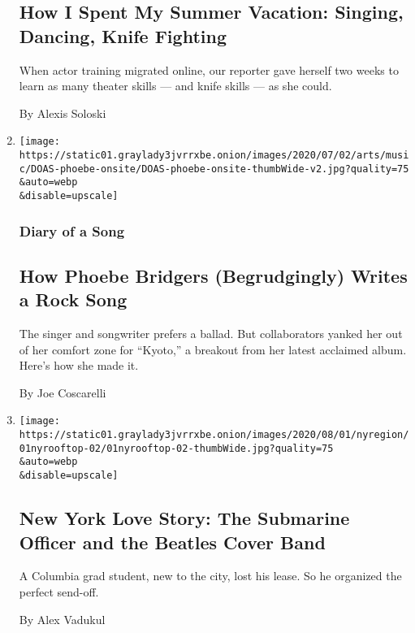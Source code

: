 \begin{enumerate}
  \hypertarget{how-i-spent-my-summer-vacation-singing-dancing-knife-fighting}{%
  \subsection{How I Spent My Summer Vacation: Singing, Dancing, Knife
  Fighting}\label{how-i-spent-my-summer-vacation-singing-dancing-knife-fighting}}

  When actor training migrated online, our reporter gave herself two
  weeks to learn as many theater skills --- and knife skills --- as she
  could.

  By Alexis Soloski
\item
  \href{/2020/07/30/arts/music/phoebe-bridgers-kyoto.html}{}

  \texttt{[image: https://static01.graylady3jvrrxbe.onion/images/2020/07/02/arts/music/DOAS-phoebe-onsite/DOAS-phoebe-onsite-thumbWide-v2.jpg?quality=75\\\&auto=webp\\\&disable=upscale]}

  \hypertarget{diary-of-a-song}{%
  \subsubsection{Diary of a Song}\label{diary-of-a-song}}

  \hypertarget{how-phoebe-bridgers-begrudgingly-writes-a-rock-song}{%
  \subsection{How Phoebe Bridgers (Begrudgingly) Writes a Rock
  Song}\label{how-phoebe-bridgers-begrudgingly-writes-a-rock-song}}

  The singer and songwriter prefers a ballad. But collaborators yanked
  her out of her comfort zone for ``Kyoto,'' a breakout from her latest
  acclaimed album. Here's how she made it.

  By Joe Coscarelli
\item
  \href{/2020/07/30/nyregion/coronavirus-beatles-nyc.html}{}

  \texttt{[image: https://static01.graylady3jvrrxbe.onion/images/2020/08/01/nyregion/01nyrooftop-02/01nyrooftop-02-thumbWide.jpg?quality=75\\\&auto=webp\\\&disable=upscale]}

  \hypertarget{new-york-love-story-the-submarine-officer-and-the-beatles-cover-band}{%
  \subsection{New York Love Story: The Submarine Officer and the Beatles
  Cover
  Band}\label{new-york-love-story-the-submarine-officer-and-the-beatles-cover-band}}

  A Columbia grad student, new to the city, lost his lease. So he
  organized the perfect send-off.

  By Alex Vadukul
\end{enumerate}

